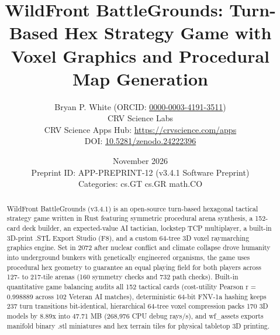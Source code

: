 \documentclass[10pt,letterpaper]{article}
\title{\textbf{WildFront BattleGrounds: Turn-Based Hex Strategy Game with Voxel Graphics and Procedural Map Generation}}
\author{Bryan P. White (ORCID: \href{https://orcid.org/0000-0003-4191-3511}{0000-0003-4191-3511}) \\ CRV Science Labs \\ \small CRV Science Apps Hub: \url{https://crvscience.com/apps} \\ \small DOI: \href{https://doi.org/10.5281/zenodo.24222396}{10.5281/zenodo.24222396}}
\date{November 2026 \\ \small Preprint ID: APP-PREPRINT-12 (v3.4.1 Software Preprint) \\ \small Categories: cs.GT \textbullet{} cs.GR \textbullet{} math.CO}
\begin{document}
\maketitle

\begin{abstract}
WildFront BattleGrounds (v3.4.1) is an open-source turn-based hexagonal tactical strategy game written in Rust featuring symmetric procedural arena synthesis, a 152-card deck builder, an expected-value AI tactician, lockstep TCP multiplayer, a built-in 3D-print .STL Export Studio (F8), and a custom 64-tree 3D voxel raymarching graphics engine. Set in 2072 after nuclear conflict and climate collapse drove humanity into underground bunkers with genetically engineered organisms, the game uses procedural hex geometry to guarantee an equal playing field for both players across 127- to 217-tile arenas (160 symmetry checks and 732 path checks). Built-in quantitative game balancing audits all 152 tactical cards (cost-utility Pearson r = 0.998889 across 102 Veteran AI matches), deterministic 64-bit FNV-1a hashing keeps 237 turn transitions bit-identical, hierarchical 64-tree voxel compression packs 170 3D models by 8.89x into 47.71 MB (268,976 CPU debug rays/s), and wf\_assets exports manifold binary .stl miniatures and hex terrain tiles for physical tabletop 3D printing.
\end{abstract}
\end{document}
